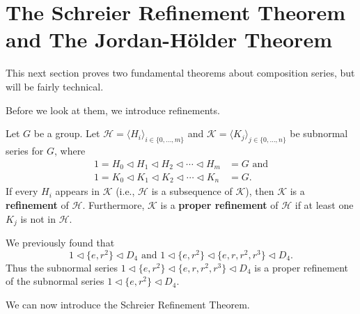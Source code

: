 \section{The Schreier Refinement Theorem and The Jordan-H\"older Theorem}
This next section proves two fundamental theorems about composition series, but will be fairly technical.

Before we look at them, we introduce refinements.
\begin{definition}
    Let $G$ be a group. Let $\mathcal{H} = \langle H_i \rangle_{i\in\{0,\dots,m\}}$ and $\mathcal{K} = \langle K_j \rangle_{j\in\{0,\dots,n\}}$ be subnormal series for $G$, where
    \begin{align*}
        1 = H_0 \lhd H_1 \lhd H_2 \lhd \cdots \lhd H_m &= G \text{ and}\\
        1 = K_0 \lhd K_1 \lhd K_2 \lhd \cdots \lhd K_n &= G.
    \end{align*}
    If every $H_i$ appears in $\mathcal{K}$ (i.e., $\mathcal{H}$ is a subsequence of $\mathcal{K}$), then $\mathcal{K}$ is a \textbf{refinement} of $\mathcal{H}$. Furthermore, $\mathcal{K}$ is a \textbf{proper refinement} of $\mathcal{H}$ if at least one $K_j$ is not in $\mathcal{H}$.
\end{definition}
\begin{example}
    We previously found that
    \[
        1 \lhd \{e, r^2\} \lhd D_4 \text{ and } 1 \lhd \{e, r^2\} \lhd \{e, r, r^2, r^3\} \lhd D_4.
    \]
    Thus the subnormal series $1 \lhd \{e, r^2\} \lhd \{e, r, r^2, r^3\} \lhd D_4$ is a proper refinement of the subnormal series $1 \lhd \{e, r^2\} \lhd D_4$.
\end{example}

We can now introduce the Schreier Refinement Theorem.

